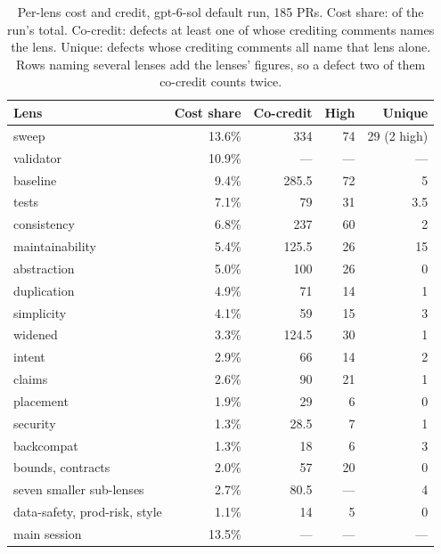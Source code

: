 \documentclass[11pt,a4paper]{article}
\begin{document}
\begin{table}[!tbp]
\centering
\small
\caption{Per-lens cost and credit, gpt-6-sol default run, 185 PRs. Cost
share: of the run's total. Co-credit: defects at least one of whose
crediting comments names the lens. Unique: defects whose crediting comments
all name that lens alone. Rows naming several lenses add the lenses'
figures, so a defect two of them co-credit counts twice.}
\label{tab:lenscost}
\begin{tabular}{lrrrr}
\toprule
Lens & Cost share & Co-credit & High & Unique \\
\midrule
sweep & 13.6\% & 334 & 74 & 29 (2 high) \\
validator & 10.9\% & --- & --- & --- \\
baseline & 9.4\% & 285.5 & 72 & 5 \\
tests & 7.1\% & 79 & 31 & 3.5 \\
consistency & 6.8\% & 237 & 60 & 2 \\
maintainability & 5.4\% & 125.5 & 26 & 15 \\
abstraction & 5.0\% & 100 & 26 & 0 \\
duplication & 4.9\% & 71 & 14 & 1 \\
simplicity & 4.1\% & 59 & 15 & 3 \\
widened & 3.3\% & 124.5 & 30 & 1 \\
intent & 2.9\% & 66 & 14 & 2 \\
claims & 2.6\% & 90 & 21 & 1 \\
placement & 1.9\% & 29 & 6 & 0 \\
security & 1.3\% & 28.5 & 7 & 1 \\
backcompat & 1.3\% & 18 & 6 & 3 \\
bounds, contracts & 2.0\% & 57 & 20 & 0 \\
seven smaller sub-lenses & 2.7\% & 80.5 & --- & 4 \\
data-safety, prod-risk, style & 1.1\% & 14 & 5 & 0 \\
main session & 13.5\% & --- & --- & --- \\
\bottomrule
\end{tabular}
\end{table}
\end{document}
